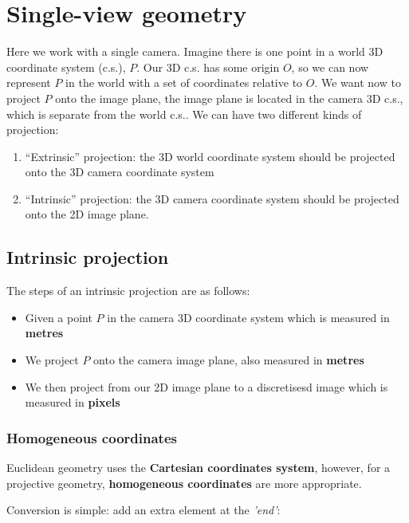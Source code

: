 \documentclass{article}
\begin{document}
\section{Single-view geometry}
\label{sec:singleview}

Here we work with a single camera. Imagine there is one point in a world 3D coordinate system (c.s.), $P$. Our 3D c.s. has some origin $O$, so we can now represent $P$ in the world with a set of coordinates relative to $O$. We want now to project $P$ onto the image plane, the image plane is located in the camera 3D c.s., which is separate from the world c.s.. We can have two different kinds of projection:

\begin{enumerate}
  \item ``Extrinsic'' projection: the 3D world coordinate system should be projected onto the 3D camera coordinate system
  \item ``Intrinsic'' projection: the 3D camera coordinate system should be projected onto the 2D image plane.
\end{enumerate}

\subsection{Intrinsic projection}
\label{subsec:intrinsic-projection}

The steps of an intrinsic projection are as follows:

\begin{itemize}
  \item Given a point $P$ in the camera 3D coordinate system which is measured in \textbf{metres}
  \item We project $P$ onto the camera image plane, also measured in \textbf{metres}
  \item We then project from our 2D image plane to a discretisesd image which is measured in \textbf{pixels}
\end{itemize}

\subsubsection{Homogeneous coordinates}

Euclidean geometry uses the \textbf{Cartesian coordinates system}, however, for a projective geometry, \textbf{homogeneous coordinates} are more appropriate.

Conversion is simple: add an extra element at the \textit{'end'}:
\end{document}
